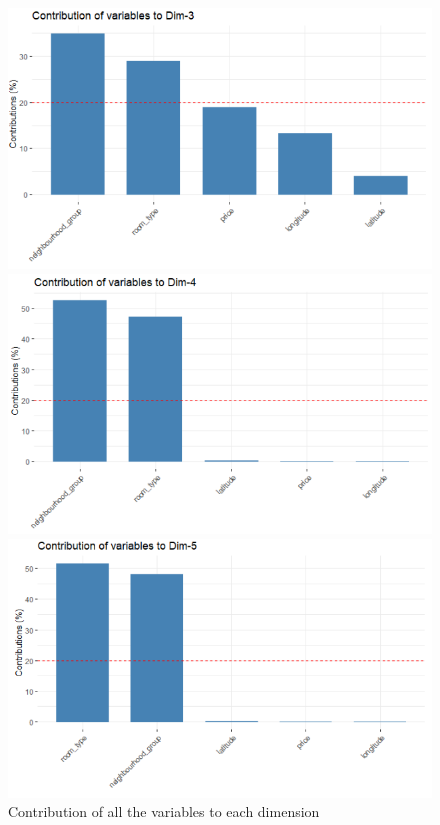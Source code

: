 \documentclass{FR16}
\begin{document}
\begin{figure}[!htb]
\begin{minipage}{0.33\textwidth}
     \includegraphics[width=1\linewidth]{figures/FAMD9.png} 
   \end{minipage}\hfill
   \begin{minipage}{0.33\textwidth}
     \centering
     \includegraphics[width=1\linewidth]{figures/FAMD10.png}
   \end{minipage}
   \begin{minipage}{0.33\textwidth}
     \centering
     \includegraphics[width=1\linewidth]{figures/FAMD11.png}
   \end{minipage}
  \caption{\label{fig:37}  Contribution of all the variables to each dimension}

\end{figure}
\end{document}
